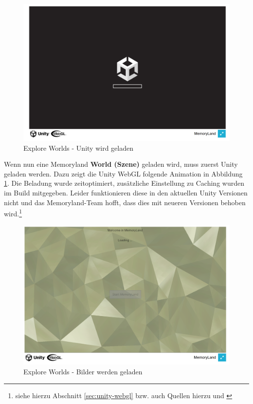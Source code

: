 \begin{figure} [h t]
    \centering
    \includegraphics[scale=0.5]{pics/explore_worlds_loading_unity.PNG}
    \caption{Explore Worlds - Unity wird geladen}
    \label{fig:explore-worlds-loading-unity}
\end{figure}

Wenn nun eine Memoryland \textbf{World (Szene)} geladen wird, muss zuerst Unity geladen werden. Dazu zeigt die Unity WebGL folgende Animation in Abbildung \ref{fig:explore-worlds-loading-unity}. Die Beladung wurde zeitoptimiert, zusätzliche Einstellung zu Caching wurden im Build mitgegeben. Leider funktionieren diese in den aktuellen Unity Versionen nicht und das Memoryland-Team hofft, dass dies mit neueren Versionen behoben wird.\footnote{siehe hierzu Abschnitt \ref{sec:unity-webgl} bzw. auch Quellen hierzu \cite{UnityDocsDataCachingIssue} und \cite{UnityDocsDataCachingIssue2}}


\begin{figure} [h t]
    \centering
    \includegraphics[scale=0.5]{pics/explore_worlds_loading.PNG}
    \caption{Explore Worlds - Bilder werden geladen}
    \label{fig:explore-worlds-loading}
\end{figure}


